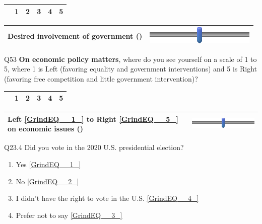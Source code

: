 \documentclass{article} %
\begin{document}
\begin{tabular}{|p{2.2in}|p{0.4in}|p{0.4in}|p{0.4in}|p{0.4in}|p{0.4in}|} \hline 
 & 1 & 2 & 3 & 4 & 5 \\ \hline 
\end{tabular}



\begin{tabular}{|p{2.2in}|p{2.2in}|} \hline 
Desired involvement of government () & \includegraphics*[width=2.08in, height=0.33in]{image13} \\ \hline 
\end{tabular}



\noindent 

\noindent 

\noindent 

\noindent Q53 \textbf{On economic policy matters}, where do you see yourself on a scale of 1 to 5, where 1 is Left (favoring equality and government interventions) and 5 is Right (favoring free competition and little government intervention)?

\begin{tabular}{|p{2.2in}|p{0.4in}|p{0.4in}|p{0.4in}|p{0.4in}|p{0.4in}|} \hline 
 & 1 & 2 & 3 & 4 & 5 \\ \hline 
\end{tabular}



\begin{tabular}{|p{2.2in}|p{2.2in}|} \hline 
Left \eqref{GrindEQ__1_} to Right \eqref{GrindEQ__5_} on economic issues () & \includegraphics*[width=2.08in, height=0.33in]{image14} \\ \hline 
\end{tabular}



\noindent 

\noindent 

\noindent 

\noindent Q23.4 Did you vote in the 2020 U.S. presidential election?

\begin{enumerate}
\item  Yes  \eqref{GrindEQ__1_} 

\item  No  \eqref{GrindEQ__2_} 

\item  I didn't have the right to vote in the U.S.  \eqref{GrindEQ__4_} 

\item  Prefer not to say  \eqref{GrindEQ__3_} 
\end{enumerate}
\end{document}
